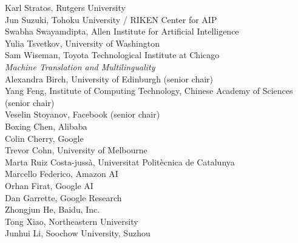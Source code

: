 \hspace*{0.2in} Karl Stratos, Rutgers University\\
\hspace*{0.2in} Jun Suzuki, Tohoku University / RIKEN Center for AIP\\
\hspace*{0.2in} Swabha Swayamdipta, Allen Institute for Artificial Intelligence\\
\hspace*{0.2in} Yulia Tsvetkov, University of Washington\\
\hspace*{0.2in} Sam Wiseman, Toyota Technological Institute at Chicago\\

\emph{Machine Translation and Multilinguality} \\
\hspace*{0.2in} Alexandra Birch, University of Edinburgh (senior chair)\\
\hspace*{0.2in} Yang Feng, Institute of Computing Technology, Chinese Academy of Sciences (senior chair)\\
\hspace*{0.2in} Veselin Stoyanov, Facebook (senior chair)\\
\hspace*{0.2in} Boxing Chen, Alibaba\\
\hspace*{0.2in} Colin Cherry, Google\\
\hspace*{0.2in} Trevor Cohn, University of Melbourne\\
\hspace*{0.2in} Marta Ruiz Costa-jussà, Universitat Politècnica de Catalunya\\
\hspace*{0.2in} Marcello Federico, Amazon AI\\
\hspace*{0.2in} Orhan Firat, Google AI\\
\hspace*{0.2in} Dan Garrette, Google Research\\
\hspace*{0.2in} Zhongjun He, Baidu, Inc.\\
\hspace*{0.2in} Tong Xiao, Northeastern University\\
\hspace*{0.2in} Junhui Li, Soochow University, Suzhou\\

